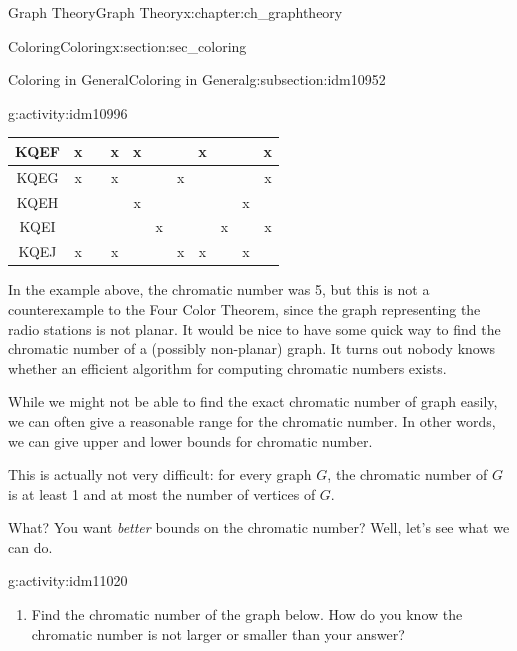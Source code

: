 \documentclass[oneside,10pt,]{book}
\numberwithin{equation}{chapter}
\begin{document}
\begin{chapterptx}{Graph Theory}{}{Graph Theory}{}{}{x:chapter:ch_graphtheory}
\begin{sectionptx}{Coloring}{}{Coloring}{}{}{x:section:sec_coloring}
\begin{subsectionptx}{Coloring in General}{}{Coloring in General}{}{}{g:subsection:idm10952}
\begin{activity}{}{g:activity:idm10996}
\begin{sidebyside}{1}{0}{0}{0}
\begin{sbspanel}{1}
{\begin{tabular}{c|c|c|c|c|c|c|c|c|c|c|}
{\tiny KQEF }&  x   &      &  x   &  x   &      &      &   x  &      &      &  x   \\ \hline
{\tiny KQEG }&  x   &      &  x   &      &      &  x   &      &      &      &  x   \\ \hline
{\tiny KQEH }&      &      &      &  x   &      &      &      &      &  x   &      \\ \hline
{\tiny KQEI }&      &      &      &      &  x   &      &      &  x   &      &  x   \\ \hline
{\tiny KQEJ }&  x   &      &  x   &      &      &  x   &   x  &      &  x   &      \\ \hline
\end{tabular}
}%
\end{sbspanel}%
\end{sidebyside}%
\end{activity}
In the example above, the chromatic number was 5, but this is not a counterexample to the Four Color Theorem, since the graph representing the radio stations is not planar. It would be nice to have some quick way to find the chromatic number of a (possibly non-planar) graph. It turns out nobody knows whether an efficient algorithm for computing chromatic numbers exists.%
\par
While we might not be able to find the exact chromatic number of graph easily, we can often give a reasonable range for the chromatic number. In other words, we can give upper and lower bounds for chromatic number.%
\par
This is actually not very difficult: for every graph \(G\), the chromatic number of \(G\) is at least 1 and at most the number of vertices of \(G\).%
\par
What? You want \emph{better} bounds on the chromatic number? Well, let's see what we can do.%
\begin{activity}{}{g:activity:idm11020}%
\begin{enumerate}[font=\bfseries,label=(\alph*),ref=\alph*]
\item{}Find the chromatic number of the graph below.  How do you know the chromatic number is not larger or smaller than your answer?%
\begin{sidebyside}{1}{0.375}{0.375}{0}%
\begin{sbspanel}{0.25}%
\end{sbspanel}
\end{sidebyside}
\end{enumerate}
\end{activity}
\end{subsectionptx}
\end{sectionptx}
\end{chapterptx}
\end{document}
